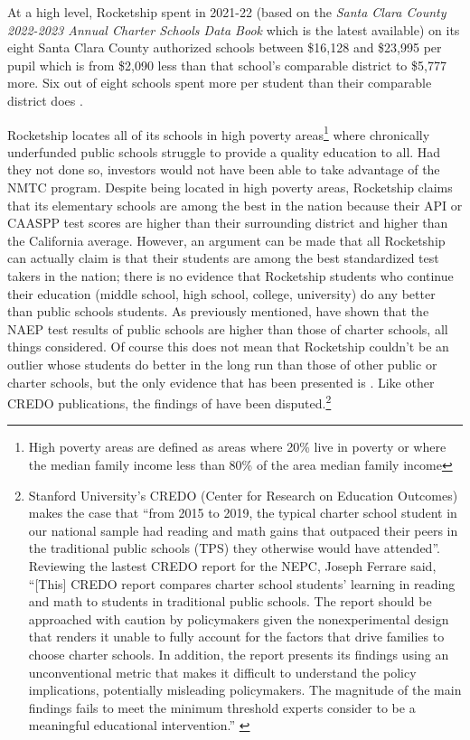 At a high level, Rocketship spent in 2021-22 (based on the \textit{Santa Clara County 2022-2023 Annual Charter Schools Data Book} which is the latest available) on its eight Santa Clara County authorized schools between \$16,128 and \$23,995 per pupil which is from \$2,090 less than that school's comparable district to \$5,777 more. Six out of eight schools spent more per student than their comparable district does \parencite{SCCOE14-23}.

Rocketship locates all of its schools in high poverty areas\footnote{High poverty areas are defined as areas where 20\% live in poverty or where the median family income less than 80\% of the area median family income\parencite[13-14]{CDFI2020}} where chronically underfunded public schools struggle to provide a quality education to all. Had they not done so, investors would not have been able to take advantage of the NMTC program. Despite being located in high poverty areas, Rocketship claims that its elementary schools are among the best in the nation \parencite{Abousalem2021} because their API or CAASPP test scores are higher than their surrounding district and higher than the California average. However, an argument can be made that all Rocketship can actually claim is that their students are among the best standardized test takers in the nation; there is no evidence that Rocketship students who continue their education (middle school, high school, college, university) do any better than public schools students. As previously mentioned, \textcite{Lubienski.Lubienski2014} have shown that the NAEP test results of public schools are higher than those of charter schools, all things considered. Of course this does not mean that Rocketship couldn't be an outlier whose students do better in the long run than those of other public or charter schools, but the only evidence that has been presented is \textcite{Raymond.etal2023}. Like other CREDO publications, the findings of \textcite{Raymond.etal2023} have been disputed.\footnote{Stanford University's CREDO (Center for Research on Education Outcomes) makes the case that ``from 2015 to 2019, the typical charter school student in our national sample had reading and math gains that outpaced their peers in the traditional public schools (TPS) they otherwise would have attended''. Reviewing the lastest CREDO report for the NEPC, Joseph Ferrare said, ``[This] CREDO report compares charter school students’ learning in reading and math to students in traditional public schools. The report should be approached with caution by policymakers given the nonexperimental design that renders it unable to fully account for the factors that drive families to choose charter schools. In addition, the report presents its findings using an unconventional metric that makes it difficult to understand the policy implications, potentially misleading policymakers. The magnitude of the main findings fails to meet the minimum threshold experts consider to be a meaningful educational intervention.'' \parencite{Ferrare2023}}


